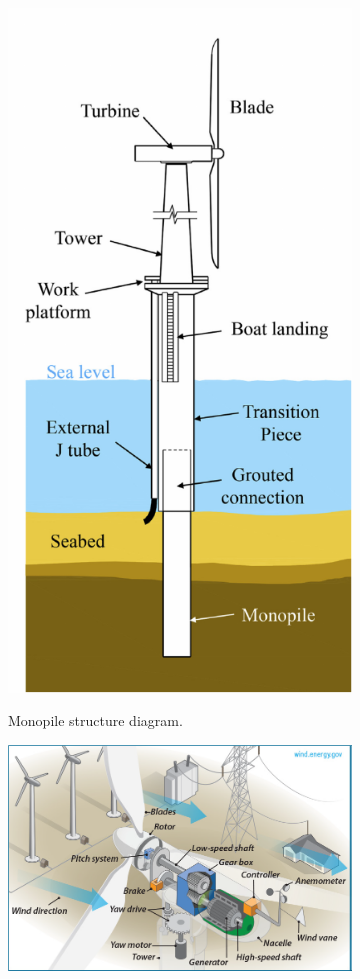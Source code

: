 \begin{figure}
    \centering
    \begin{subfigure}[b]{0.3\textwidth}
        \centering
        \includegraphics[width=0.7\linewidth]{./part1/figures/owt_diagram.pdf}
        \label{fig:struc_components}
        \caption{Monopile structure diagram.}
    \end{subfigure}
    \begin{subfigure}[b]{0.48\textwidth}
        \centering
        \includegraphics[width=\linewidth]{./part1/figures/nacelle_components.png}

\end{subfigure}
\end{figure}
